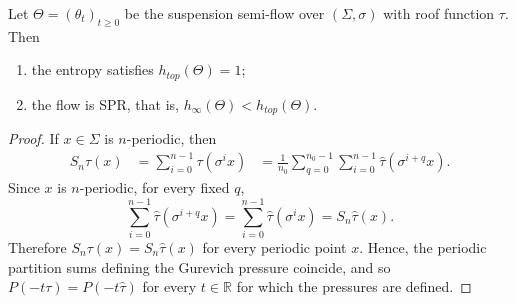 \documentclass[letterpaper,11pt]{amsart}
\numberwithin{equation}{section}     %
\newcommand{\R}{\mathbb{R}}
\def\R{{\mathbb R}}
\begin{document}
\begin{proposition} \label{en_flo}
Let \(\Theta=(\theta_t)_{t\geq 0}\) be the suspension semi-flow over
\((\Sigma,\sigma)\) with roof function \(\tau\). Then
\begin{enumerate}
\item[(1)] the entropy satisfies \(h_{top}(\Theta)=1\);
\item[(2)] the flow is SPR, that is, $h_{\infty}(\Theta)<h_{top}(\Theta).$
\end{enumerate}
\end{proposition}

\begin{proof} If $x\in\Sigma$ is $n$-periodic, then
\[
\begin{aligned}
S_n\tau(x)
&=
\sum_{i=0}^{n-1}\tau(\sigma^i x)  
&=
\frac1{n_0}
\sum_{q=0}^{n_0-1}
\sum_{i=0}^{n-1}
\widehat\tau(\sigma^{i+q}x).
\end{aligned}
\]
Since \(x\) is \(n\)-periodic, for every fixed \(q\),
\[
\sum_{i=0}^{n-1}\widehat\tau(\sigma^{i+q}x)
=
\sum_{i=0}^{n-1}\widehat\tau(\sigma^i x)
=
S_n\widehat\tau(x).
\]
Therefore $S_n\tau(x)=S_n\widehat\tau(x)$
for every periodic point $x$. Hence, the periodic partition sums defining the Gurevich pressure coincide, and so $P(-t\tau)=P(-t\widehat\tau)$
for every $t\in\R$ for which the pressures are defined.


\end{proof}
\end{document}
